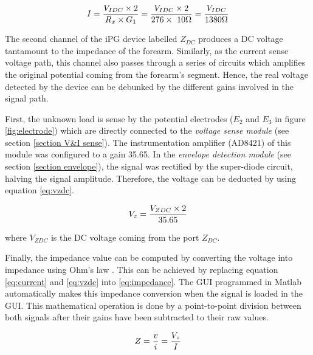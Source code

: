 \begin{align}
	\label{eq:current}
	I = \frac{V_{IDC} \times 2}{R_x \times G_1} = \frac{V_{IDC} \times 2}{276 \times\ 10 \Omega} = \frac{V_{IDC}}{1380 \Omega} \tagaddtext{[\si{\ampere}]}
\end{align}


The second channel of the iPG device labelled $Z_{DC}$ produces a DC voltage tantamount to the impedance of the forearm. Similarly, as the current sense voltage path, this channel also passes through a series of circuits which amplifies the original potential coming from the forearm's segment. Hence, the real voltage detected by the device can be debunked by the different gains involved in the signal path. 

First, the unknown load is sense by the potential electrodes ($E_2$ and $E_3$ in figure \ref{fig:electrode}) which are directly connected to the \textit{voltage sense module} (see section \ref{section V&I sense}). The instrumentation amplifier (AD8421) of this module was configured to a gain \num{35.65}. In the \textit{envelope detection module} (see section \ref{section envelope}), the signal was rectified by the super-diode circuit, halving the signal amplitude. Therefore, the voltage can be deducted by using equation \ref{eq:vzdc}.


\begin{align}
	\label{eq:vzdc}
	V_z = \frac{V_{ZDC} \times 2}{35.65} \tagaddtext{[\si{\volt}]}
\end{align}

where $V_{ZDC}$ is the DC voltage coming from the port $Z_{DC}$.

Finally, the impedance value can be computed by converting the voltage into impedance using Ohm's law \cite{ohm1827galvanische}. This can be achieved by replacing equation \ref{eq:current} and \ref{eq:vzdc} into \ref{eq:impedance}. The GUI programmed in Matlab automatically makes this impedance conversion when the signal is loaded in the GUI. This mathematical operation is done by a point-to-point division between both signals after their gains have been subtracted to their raw values. 

\begin{align}
	\label{eq:impedance}
	Z = \frac{v}{i}=\frac{V_z}{I} \tagaddtext{[\si{\ohm}]}
\end{align}


